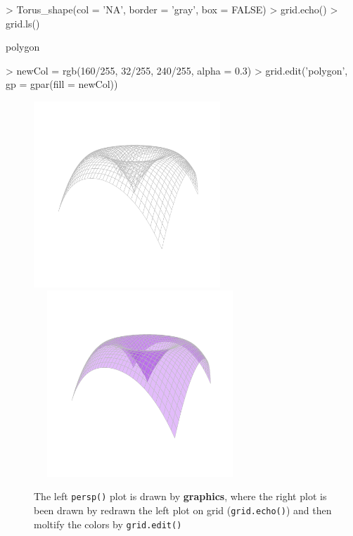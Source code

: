 \documentclass[paper=a4, fontsize=11pt]{report}
\begin{document}
\begin{Schunk}
\begin{Sinput}
> Torus_shape(col = 'NA', border = 'gray', box = FALSE)
> grid.echo()
> grid.ls()
\end{Sinput}
\begin{Soutput}
polygon
\end{Soutput}
\begin{Sinput}
> newCol = rgb(160/255, 32/255, 240/255, alpha = 0.3)
> grid.edit('polygon', gp = gpar(fill = newCol))
\end{Sinput}
\end{Schunk}

\begin{figure}[h]
	\begin{center}
		\includegraphics[height = 7cm, width = 7cm]{figure/Chapter6_example_1_2.pdf}
		\includegraphics[height = 7cm, width = 8cm]{figure/Chapter6_example_1_3.pdf}
		\caption{The left \texttt{persp()} plot is drawn by \textbf{graphics}, where the right plot is been drawn by redrawn the left plot on grid (\texttt{grid.echo()}) and then moltify the colors by \texttt{grid.edit()}}
		\label{Example_6.3}
	\end{center}
\end{figure}
\end{document}
